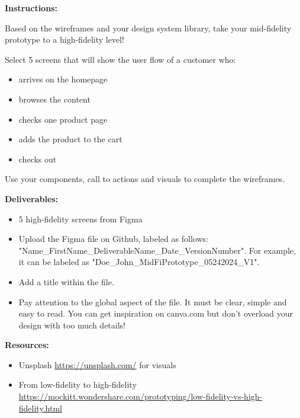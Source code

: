\makeheaderfiles

\textbf{Instructions:}

Based on the wireframes and your design system library, take your mid-fidelity prototype to a high-fidelity level!

Select 5 screens that will show the user flow of a customer who:

\begin{itemize}
\item arrives on the homepage
\item browses the content
\item checks one product page
\item adds the product to the cart
\item checks out
\end{itemize}

Use your components, call to actions and visuals to complete the wireframes.

\textbf{Deliverables:}

\begin{itemize}
\item 5 high-fidelity screens from Figma
\item Upload the Figma file on Github, labeled as follows: "Name\_FirstName\_DeliverableName\_Date\_VersionNumber". For example, it can be labeled as "Doe\_John\_MidFiPrototype\_05242024\_V1".
\item Add a title within the file.
\item Pay attention to the global aspect of the file. It must be clear, simple and easy to read. You can get inspiration on canva.com but don't overload your design with too much details!
\end{itemize}

\textbf{Resources:}

\begin{itemize}
\item Unsplash \url{https://unsplash.com/} for visuals
\item From low-fidelity to high-fidelity \url{https://mockitt.wondershare.com/prototyping/low-fidelity-vs-high-fidelity.html}
\end{itemize}

